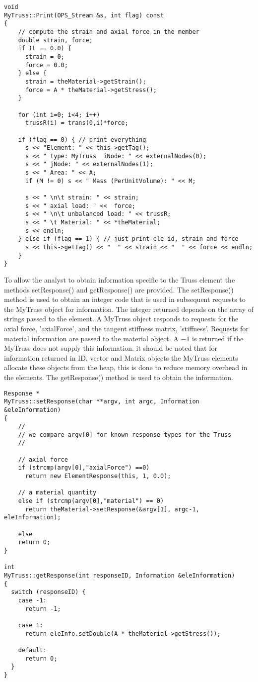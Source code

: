 \documentclass[12pt]{article}
\begin{document}
{\sf\small
\begin{verbatim}
void
MyTruss::Print(OPS_Stream &s, int flag) const
{
    // compute the strain and axial force in the member
    double strain, force;
    if (L == 0.0) {
      strain = 0;
      force = 0.0;
    } else {
      strain = theMaterial->getStrain();
      force = A * theMaterial->getStress();    
    }

    for (int i=0; i<4; i++)
      trussR(i) = trans(0,i)*force;

    if (flag == 0) { // print everything
      s << "Element: " << this->getTag(); 
      s << " type: MyTruss  iNode: " << externalNodes(0);
      s << " jNode: " << externalNodes(1);
      s << " Area: " << A;
      if (M != 0) s << " Mass (PerUnitVolume): " << M;	
	
      s << " \n\t strain: " << strain;
      s << " axial load: " <<  force;
      s << " \n\t unbalanced load: " << trussR;
      s << " \t Material: " << *theMaterial;
      s << endln;
    } else if (flag == 1) { // just print ele id, strain and force
      s << this->getTag() << "  " << strain << "  " << force << endln;
    }
}
\end{verbatim} }


To allow the analyst to obtain information specific to the Truss
element the methods {\sf setResponse()} and {\sf getResponse()} are
provided. The {\sf setResponse()} method is used to obtain an integer
code that is used in subsequent requests to the MyTruss object for
information. The integer returned depends on the array of strings
passed to the element. A MyTruss object responds to requests for
the axial force, 'axialForce', and the tangent stiffness matrix,
'stiffness'. Requests for material information are passed to the
material object. A $-1$ is returned if the MyTruss does not supply
this information. it should be noted that for information returned in
ID, vector and Matrix objects the MyTruss elements allocate these
objects from the heap, this is done to reduce memory overhead in the
elements. The {\sf getResponse()} method is used to obtain the
information. 

{\sf\small
\begin{verbatim}
Response *
MyTruss::setResponse(char **argv, int argc, Information &eleInformation)
{
    //
    // we compare argv[0] for known response types for the Truss
    //

    // axial force
    if (strcmp(argv[0],"axialForce") ==0) 
      return new ElementResponse(this, 1, 0.0);

    // a material quantity    
    else if (strcmp(argv[0],"material") == 0)
      return theMaterial->setResponse(&argv[1], argc-1, eleInformation);

    else
	return 0;
}

int 
MyTruss::getResponse(int responseID, Information &eleInformation)
{
  switch (responseID) {
    case -1:
      return -1;
      
    case 1:
      return eleInfo.setDouble(A * theMaterial->getStress());

    default:
      return 0;
  }
}
\end{verbatim} }
\end{document}
